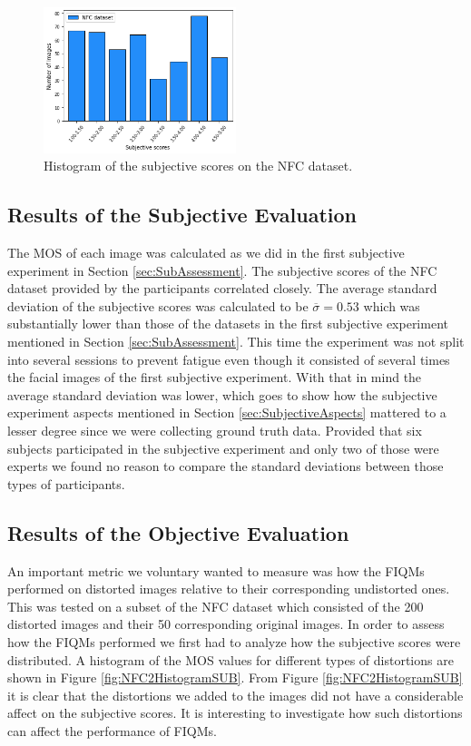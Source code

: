 \begin{figure}[h]
    \centering
    \includegraphics[width=0.5\textwidth]{figures/NFC_Histogram.png}
    \caption{Histogram of the subjective scores on the NFC dataset.}
    \label{fig:NFCHistogram}
\end{figure}

\subsection{Results of the Subjective Evaluation}
The MOS of each image was calculated as we did in the first subjective experiment in Section \ref{sec:SubAssessment}. The subjective scores of the NFC dataset provided by the participants correlated closely. The average standard deviation of the subjective scores was calculated to be $\overline{\sigma} = 0.53$ which was substantially lower than those of the datasets in the first subjective experiment mentioned in Section \ref{sec:SubAssessment}. This time the experiment was not split into several sessions to prevent fatigue even though it consisted of several times the facial images of the first subjective experiment. With that in mind the average standard deviation was lower, which goes to show how the subjective experiment aspects mentioned in Section \ref{sec:SubjectiveAspects} mattered to a lesser degree since we were collecting ground truth data. Provided that six subjects participated in the subjective experiment and only two of those were experts we found no reason to compare the standard deviations between those types of participants.


\subsection{Results of the Objective Evaluation}
An important metric we voluntary wanted to measure was how the FIQMs performed on distorted images relative to their corresponding undistorted ones. This was tested on a subset of the NFC dataset which consisted of the 200 distorted images and their 50 corresponding original images. In order to assess how the FIQMs performed we first had to analyze how the subjective scores were distributed. A histogram of the MOS values for different types of distortions are shown in Figure \ref{fig:NFC2HistogramSUB}. From Figure \ref{fig:NFC2HistogramSUB} it is clear that the distortions we added to the images did not have a considerable affect on the subjective scores. It is interesting to investigate how such distortions can affect the performance of FIQMs.


